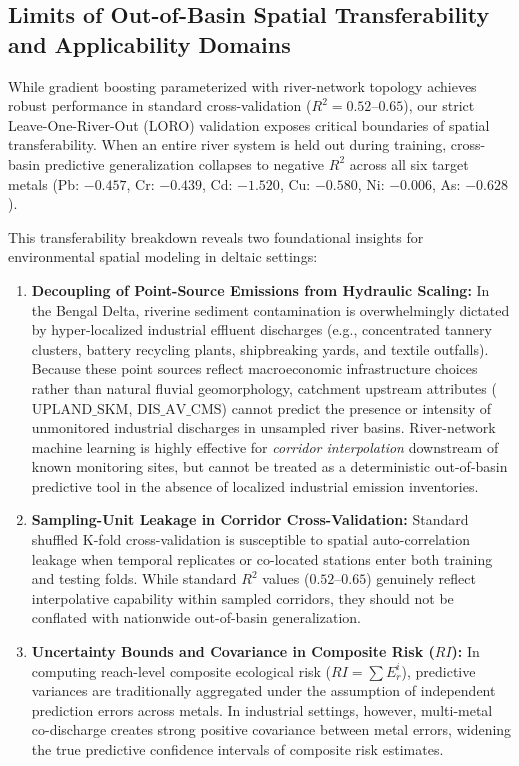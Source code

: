 \documentclass[authoryear,preprint,12pt]{elsarticle}
\begin{document}
\subsection{Limits of Out-of-Basin Spatial Transferability and Applicability Domains}
While gradient boosting parameterized with river-network topology achieves robust performance in standard cross-validation ($R^2 = 0.52\text{--}0.65$), our strict Leave-One-River-Out (LORO) validation exposes critical boundaries of spatial transferability. When an entire river system is held out during training, cross-basin predictive generalization collapses to negative $R^2$ across all six target metals (Pb: $-0.457$, Cr: $-0.439$, Cd: $-1.520$, Cu: $-0.580$, Ni: $-0.006$, As: $-0.628$). 

This transferability breakdown reveals two foundational insights for environmental spatial modeling in deltaic settings:
\begin{enumerate}
    \item \textbf{Decoupling of Point-Source Emissions from Hydraulic Scaling:} In the Bengal Delta, riverine sediment contamination is overwhelmingly dictated by hyper-localized industrial effluent discharges (e.g., concentrated tannery clusters, battery recycling plants, shipbreaking yards, and textile outfalls). Because these point sources reflect macroeconomic infrastructure choices rather than natural fluvial geomorphology, catchment upstream attributes ($\text{UPLAND\_SKM}$, $\text{DIS\_AV\_CMS}$) cannot predict the presence or intensity of unmonitored industrial discharges in unsampled river basins. River-network machine learning is highly effective for \textit{corridor interpolation} downstream of known monitoring sites, but cannot be treated as a deterministic out-of-basin predictive tool in the absence of localized industrial emission inventories.
    \item \textbf{Sampling-Unit Leakage in Corridor Cross-Validation:} Standard shuffled K-fold cross-validation is susceptible to spatial auto-correlation leakage when temporal replicates or co-located stations enter both training and testing folds. While standard $R^2$ values ($0.52\text{--}0.65$) genuinely reflect interpolative capability within sampled corridors, they should not be conflated with nationwide out-of-basin generalization.
    \item \textbf{Uncertainty Bounds and Covariance in Composite Risk ($RI$):} In computing reach-level composite ecological risk ($RI = \sum E_r^i$), predictive variances are traditionally aggregated under the assumption of independent prediction errors across metals. In industrial settings, however, multi-metal co-discharge creates strong positive covariance between metal errors, widening the true predictive confidence intervals of composite risk estimates.
\end{enumerate}
\end{document}
